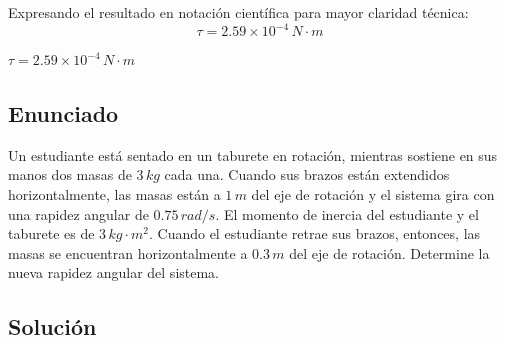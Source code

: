 \documentclass[12pt, a4paper]{article}
\begin{document}
Expresando el resultado en notación científica para mayor claridad técnica:
$$\tau = 2.59 \times 10^{-4} \, \si{N\cdot m}$$

\begin{tcolorbox}[colback=green!5!white, colframe=green!50!black, title=Respuesta Final]
\centering \Large $\tau = 2.59 \times 10^{-4} \, \si{N\cdot m}$
\end{tcolorbox}

\newpage

\subsection*{Enunciado}
Un estudiante está sentado en un taburete en rotación, mientras sostiene en sus manos dos masas de $3 \, \si{kg}$ cada una. Cuando sus brazos están extendidos horizontalmente, las masas están a $1 \, \si{m}$ del eje de rotación y el sistema gira con una rapidez angular de $0.75 \, \si{rad/s}$. El momento de inercia del estudiante y el taburete es de $3 \, \si{kg\cdot m^2}$. Cuando el estudiante retrae sus brazos, entonces, las masas se encuentran horizontalmente a $0.3 \, \si{m}$ del eje de rotación. Determine la nueva rapidez angular del sistema.

\begin{center}
\end{center}

\subsection*{Solución}
\end{document}
